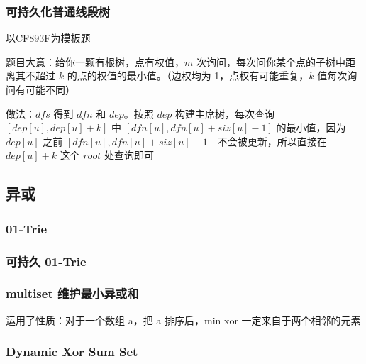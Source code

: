 \documentclass[12pt]{article}
\theoremstyle{definition}
\theoremstyle{remark}
\begin{document}
\newpage

\subsubsection{可持久化普通线段树}

以\href{http://codeforces.com/problemset/problem/893/F}{CF893F}为模板题

题目大意：给你一颗有根树，点有权值，$m$ 次询问，每次问你某个点的子树中距离其不超过 $k$ 的点的权值的最小值。（边权均为 1，点权有可能重复，$k$ 值每次询问有可能不同）

做法：$dfs$ 得到 $dfn$ 和 $dep$。按照 $dep$ 构建主席树，每次查询 $[dep[u],dep[u]+k]$ 中 $[dfn[u],dfn[u]+siz[u]-1]$ 的最小值，因为 $dep[u]$ 之前 $[dfn[u],dfn[u]+siz[u]-1]$ 不会被更新，所以直接在 $dep[u]+k$ 这个 $root$ 处查询即可



\newpage

\subsection{异或}

\subsubsection{01-Trie}



\newpage

\subsubsection{可持久 01-Trie}



\newpage

\subsubsection{multiset 维护最小异或和}

运用了性质：对于一个数组 a，把 a 排序后，min xor 一定来自于两个相邻的元素



\newpage

\subsubsection{Dynamic Xor Sum Set}
\end{document}
